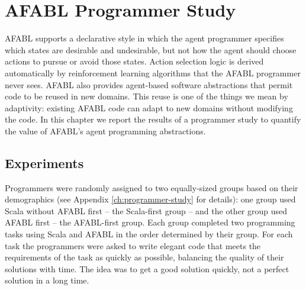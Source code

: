 \chapter{AFABL Programmer Study}\label{ch:afabl-study}







AFABL supports a declarative style in which the agent programmer specifies which states are desirable and undesirable, but not how the agent should choose actions to pursue or avoid those states. Action selection logic is derived automatically by reinforcement learning algorithms that the AFABL programmer never sees. AFABL also provides agent-based software abstractions that permit code to be reused in new domains. This reuse is one of the things we mean by adaptivity: existing AFABL code can adapt to new domains without modifying the code. In this chapter we report the results of a programmer study to quantify the value of AFABL's agent programming abstractions.

\section{Experiments}

Programmers were randomly assigned to two equally-sized groups based on their demographics (see Appendix \ref{ch:programmer-study} for details): one group used Scala without AFABL first -- the Scala-first group -- and the other group used AFABL first -- the AFABL-first group.  Each group completed two programming tasks using Scala and AFABL in the order determined by their group.  For each task the programmers were asked to write elegant code that meets the requirements of the task as quickly as possible, balancing the quality of their solutions with time.  The idea was to get a good solution quickly, not a perfect solution in a long time.

